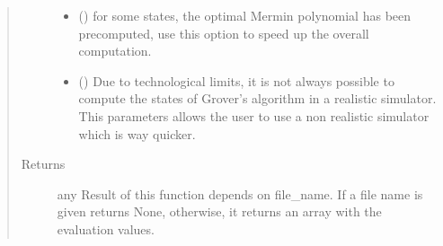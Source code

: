 \documentclass[letterpaper,10pt,english]{sphinxmanual}
\begin{document}
\begin{fulllineitems}
\begin{quote}
\begin{description}
\begin{itemize}
\item {} 
 () \textendash{} for some states, the optimal Mermin polynomial 
has been precomputed, use this option to speed up the overall computation.

\item {} 
 () \textendash{} Due to technological limits, it is not always possible 
to compute the states of Grover’s algorithm in a realistic simulator. This 
parameters allows the user to use a non realistic simulator which is way 
quicker.

\end{itemize}

\item[{Returns}] \leavevmode
any \textendash{} Result of this function depends on file\_name. If a file name
is given  returns None, otherwise, it returns an array with the 
evaluation values.

\end{description}\end{quote}

\end{fulllineitems}

\end{document}
